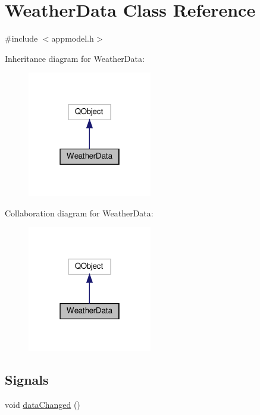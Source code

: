 \hypertarget{class_weather_data}{}\section{Weather\+Data Class Reference}
\label{class_weather_data}


{\ttfamily \#include $<$appmodel.\+h$>$}



Inheritance diagram for Weather\+Data\+:
\nopagebreak
\begin{figure}[H]
\begin{center}
\leavevmode
\includegraphics[width=154pt]{class_weather_data__inherit__graph}
\end{center}
\end{figure}


Collaboration diagram for Weather\+Data\+:
\nopagebreak
\begin{figure}[H]
\begin{center}
\leavevmode
\includegraphics[width=154pt]{class_weather_data__coll__graph}
\end{center}
\end{figure}
\subsection*{Signals}
\begin{DoxyCompactItemize}
\item 
void \hyperlink{class_weather_data_a23185106cf22ef8c57c96154e37b24d1}{data\+Changed} ()
\end{DoxyCompactItemize}
